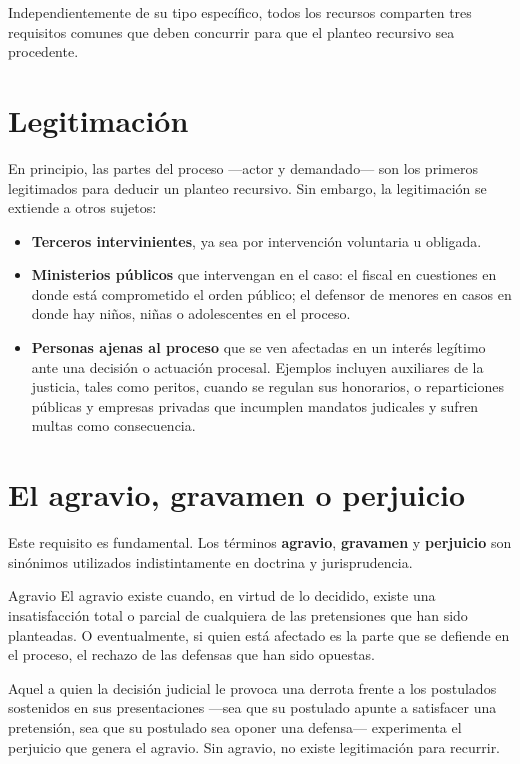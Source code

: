 \documentclass[12pt,oneside]{book}
\begin{document}
Independientemente de su tipo específico, todos los recursos comparten tres requisitos comunes que deben concurrir para que el planteo recursivo sea procedente.

\section{Legitimación}

En principio, las partes del proceso ---actor y demandado--- son los primeros legitimados para deducir un planteo recursivo. Sin embargo, la legitimación se extiende a otros sujetos:

\begin{itemize}
    \item \textbf{Terceros intervinientes}, ya sea por intervención voluntaria u obligada.
    \item \textbf{Ministerios públicos} que intervengan en el caso: el fiscal en cuestiones en donde está comprometido el orden público; el defensor de menores en casos en donde hay niños, niñas o adolescentes en el proceso.
    \item \textbf{Personas ajenas al proceso} que se ven afectadas en un interés legítimo ante una decisión o actuación procesal. Ejemplos incluyen auxiliares de la justicia, tales como peritos, cuando se regulan sus honorarios, o reparticiones públicas y empresas privadas que incumplen mandatos judicales y sufren multas como consecuencia.
\end{itemize}

\section{El agravio, gravamen o perjuicio}

Este requisito es fundamental. Los términos \textbf{agravio}, \textbf{gravamen} y \textbf{perjuicio} son sinónimos utilizados indistintamente en doctrina y jurisprudencia.

\begin{definition}{Agravio}
El agravio existe cuando, en virtud de lo decidido, existe una insatisfacción total o parcial de cualquiera de las pretensiones que han sido planteadas. O eventualmente, si quien está afectado es la parte que se defiende en el proceso, el rechazo de las defensas que han sido opuestas.
\end{definition}

Aquel a quien la decisión judicial le provoca una derrota frente a los postulados sostenidos en sus presentaciones ---sea que su postulado apunte a satisfacer una pretensión, sea que su postulado sea oponer una defensa--- experimenta el perjuicio que genera el agravio. Sin agravio, no existe legitimación para recurrir.
\end{document}
